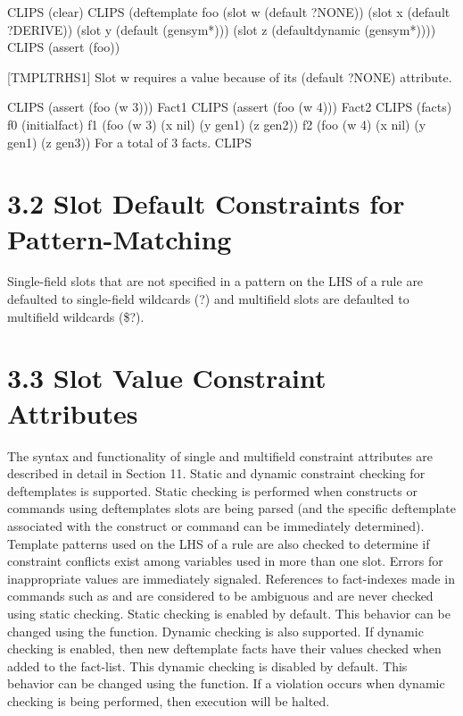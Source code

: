 \documentclass[letterpaper,10pt,english]{sphinxmanual}
\begin{document}
\begin{sphinxVerbatim}[commandchars=\\\{\}]
CLIPS\PYGZgt{} (clear)
CLIPS\PYGZgt{}
(deftemplate foo
  (slot w (default ?NONE))
  (slot x (default ?DERIVE))
  (slot y (default (gensym*)))
  (slot z (default\PYGZhy{}dynamic (gensym*))))
CLIPS\PYGZgt{} (assert (foo))

[TMPLTRHS1] Slot w requires a value because of its (default ?NONE)
attribute.

CLIPS\PYGZgt{} (assert (foo (w 3)))
\PYGZlt{}Fact\PYGZhy{}1\PYGZgt{}
CLIPS\PYGZgt{} (assert (foo (w 4)))
\PYGZlt{}Fact\PYGZhy{}2\PYGZgt{}
CLIPS\PYGZgt{} (facts)
f\PYGZhy{}0 (initial\PYGZhy{}fact)
f\PYGZhy{}1 (foo (w 3) (x nil) (y gen1) (z gen2))
f\PYGZhy{}2 (foo (w 4) (x nil) (y gen1) (z gen3))
For a total of 3 facts.
CLIPS\PYGZgt{}
\end{sphinxVerbatim}


\section{3.2 Slot Default Constraints for Pattern-Matching}
\label{\detokenize{deftemplate:slot-default-constraints-for-pattern-matching}}
Single-field slots that are not specified in a pattern on the LHS of a
rule are defaulted to single-field wildcards (?) and multifield slots
are defaulted to multifield wildcards (\$?).


\section{3.3 Slot Value Constraint Attributes}
\label{\detokenize{deftemplate:slot-value-constraint-attributes}}
The syntax and functionality of single and multifield constraint
attributes are described in detail in Section 11. Static and dynamic
constraint checking for deftemplates is supported. Static checking is
performed when constructs or commands using deftemplates slots are being
parsed (and the specific deftemplate associated with the construct or
command can be immediately determined). Template patterns used on the
LHS of a rule are also checked to determine if constraint conflicts
exist among variables used in more than one slot. Errors for
inappropriate values are immediately signaled. References to
fact-indexes made in commands such as  and  are
considered to be ambiguous and are never checked using static checking.
Static checking is enabled by default. This behavior can be changed
using the  function. Dynamic checking
is also supported. If dynamic checking is enabled, then new deftemplate
facts have their values checked when added to the fact-list. This
dynamic checking is disabled by default. This behavior can be changed
using the  function. If a violation
occurs when dynamic checking is being performed, then execution will be
halted.
\end{document}
